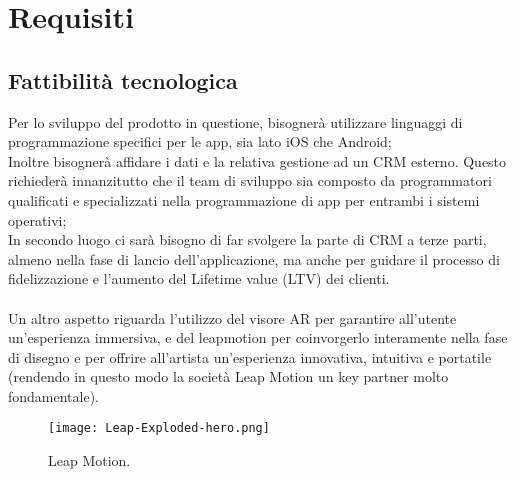 \documentclass[11pt,fleqn]{book} %
\begin{document}
\chapter{Requisiti}

\section{Fattibilità tecnologica}
Per lo sviluppo del prodotto in questione, bisognerà utilizzare linguaggi di programmazione specifici per le app, sia lato iOS che Android;\\ Inoltre bisognerà affidare i dati e la relativa gestione ad un CRM esterno. Questo richiederà innanzitutto che il team di sviluppo sia composto da programmatori qualificati e specializzati nella programmazione di app per entrambi i sistemi operativi;\\
In secondo luogo ci sarà bisogno di far svolgere la parte di CRM a terze parti, almeno nella fase di lancio dell'applicazione, ma anche per guidare il processo di fidelizzazione e l'aumento del Lifetime value (LTV) dei clienti.\\\\
Un altro aspetto riguarda l'utilizzo del visore AR per garantire all'utente un'esperienza immersiva, e del leapmotion per coinvorgerlo interamente nella fase di disegno e per offrire all'artista un'esperienza innovativa, intuitiva e portatile (rendendo in questo modo la società Leap Motion un key partner molto fondamentale).

\begin{figure}[h]
   \centering
    \texttt{[image: Leap-Exploded-hero.png]}
   \caption{Leap Motion.}
    \label{fig:awesome_image}
\end{figure}
\end{document}
